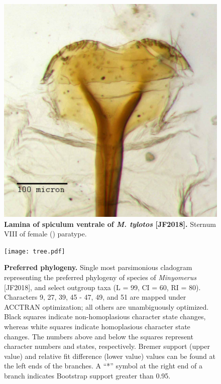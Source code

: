 \documentclass[fleqn,10pt,lineno]{wlpeerj} %
\begin{document}
\begin{figure}[h]
	\centering
	\includegraphics[width=\textwidth]{tylotos_lamina.jpg}
	\caption{\textbf{Lamina of spiculum ventrale of \textit{M. tylotos} [JF2018].} Sternum VIII of female (\female) paratype.}
	\label{fig:tylotos_lamina}
\end{figure}

\begin{figure}[h]
	\centering
	\begin{sideways}
		\texttt{[image: tree.pdf]}
	\end{sideways}
	\caption{\textbf{Preferred phylogeny.} Single most parsimonious cladogram representing the preferred phylogeny of species of \textit{Minyomerus} [JF2018], and select outgroup taxa (L = 99, CI = 60, RI = 80). Characters 9, 27, 39, 45 - 47, 49, and 51 are mapped under ACCTRAN optimization; all others are unambiguously optimized. Black squares indicate non-homoplasious character state changes, whereas white squares indicate homoplasious character state changes. The numbers above and below the squares represent character numbers and states, respectively. Bremer support (upper value) and relative fit difference (lower value) values can be found at the left ends of the branches. A ``*'' symbol at the right end of a branch indicates Bootstrap support greater than 0.95.}
	\label{fig:tree}
\end{figure}
\end{document}
